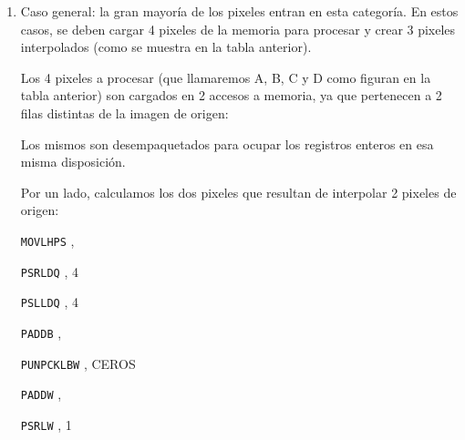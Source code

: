 \begin{enumerate}
  \item Caso general: la gran mayoría de los pixeles entran en esta categoría. En estos casos, se deben cargar 4 pixeles de la memoria para procesar y crear 3 pixeles interpolados (como se muestra en la tabla anterior).

  Los 4 pixeles a procesar (que llamaremos A, B, C y D como figuran en la tabla anterior) son cargados en 2 accesos a memoria, ya que pertenecen a 2 filas distintas de la imagen de origen:

  \begin{center}
     

     
  \end{center}

  Los mismos son desempaquetados para ocupar los registros enteros en esa misma disposición.

  Por un lado, calculamos los dos pixeles que resultan de interpolar 2 pixeles de origen:

  \begin{center}

     

    \texttt{MOVLHPS} ,  \hfill

     

     

     

    \texttt{PSRLDQ} , 4 \hfill

    \texttt{PSLLDQ} , 4 \hfill

     

     

    \texttt{PADDB} ,  \hfill

     

    \texttt{PUNPCKLBW} , CEROS \hfill

     

    \texttt{PADDW} ,  \hfill

     

    \texttt{PSRLW} , 1 \hfill

     
  \end{center}


\end{enumerate}
